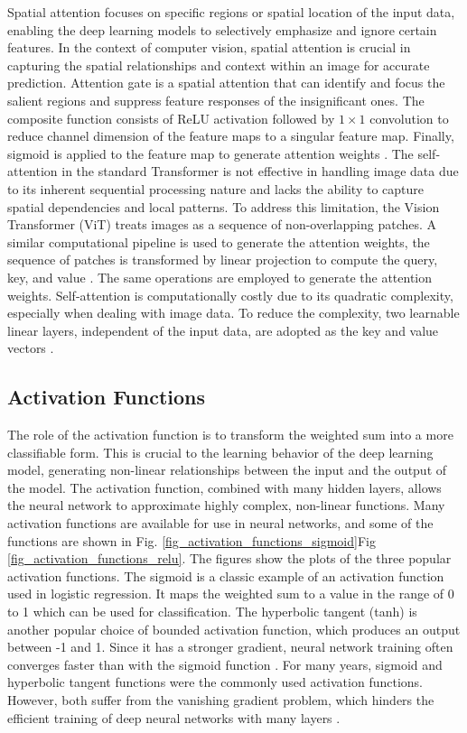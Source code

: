 \documentclass[preprint,12pt]{elsarticle}
\begin{document}
Spatial attention focuses on specific regions or spatial location of the input data, enabling the deep learning models to selectively emphasize and ignore certain features. In the context of computer vision, spatial attention is crucial in capturing the spatial relationships and context within an image for accurate prediction. Attention gate is a spatial attention that can identify and focus the salient regions and suppress feature responses of the insignificant ones. The composite function consists of ReLU activation followed by $1 \times 1$ convolution to reduce channel dimension of the feature maps to a singular feature map. Finally, sigmoid is applied to the feature map to generate attention weights \citep{oktay_attention_2018}. The self-attention in the standard Transformer is not effective in handling image data due to its inherent sequential processing nature and lacks the ability to capture spatial dependencies and local patterns. To address this limitation, the Vision Transformer (ViT) treats images as a sequence of non-overlapping patches. A similar computational pipeline is used to generate the attention weights, the sequence of patches is transformed by linear projection to compute the query, key, and value \citep{dosovitskiy_image_2021}. The same operations are employed to generate the attention weights. Self-attention is computationally costly due to its quadratic complexity, especially when dealing with image data. To reduce the complexity, two learnable linear layers, independent of the input data, are adopted as the key and value vectors \citep{guo_beyond_2023}. 

\subsection{Activation Functions}
The role of the activation function is to transform the weighted sum into a more classifiable form. This is crucial to the learning behavior of the deep learning model, generating non-linear relationships between the input and the output of the model. The activation function, combined with many hidden layers, allows the neural network to approximate highly complex, non-linear functions. Many activation functions are available for use in neural networks, and some of the functions are shown in Fig. \ref{fig_activation_functions_sigmoid}\textemdash Fig \ref{fig_activation_functions_relu}. The figures show the plots of the three popular activation functions. The sigmoid is a classic example of an activation function used in logistic regression. It maps the weighted sum to a value in the range of 0 to 1 which can be used for classification. The hyperbolic tangent (tanh) is another popular choice of bounded activation function, which produces an output between -1 and 1. Since it has a stronger gradient, neural network training often converges faster than with the sigmoid function \citep{lecun_efficient_2012}. For many years, sigmoid and hyperbolic tangent functions were the commonly used activation functions. However, both suffer from the vanishing gradient problem, which hinders the efficient training of deep neural networks with many layers \citep{hochreiter_gradient_2001}. 
\end{document}
